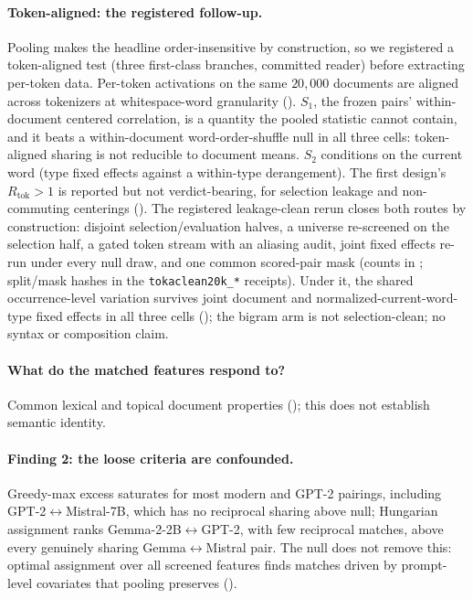 \paragraph{Token-aligned: the registered follow-up.}\label{sec:results:tokalign}
Pooling makes the headline order-insensitive by construction, so we registered a token-aligned
test (three first-class branches, committed reader) before extracting per-token data. Per-token
activations on the same $20{,}000$ documents are aligned across tokenizers at whitespace-word
granularity (). $S_1$, the frozen pairs' within-document
centered correlation, is a quantity the pooled statistic cannot contain, and it beats a
within-document word-order-shuffle null in all three cells: token-aligned sharing is not
reducible to document means. $S_2$ conditions on the current word (type fixed effects against a
within-type derangement). The first design's $R_{\text{tok}}>1$ is reported but not
verdict-bearing, for selection leakage and non-commuting centerings (). The
registered leakage-clean rerun closes both routes by construction: disjoint selection/evaluation
halves, a universe re-screened on the selection half, a gated token stream with an aliasing
audit, joint fixed effects re-run under every null draw, and one common scored-pair mask (counts
in ; split/mask hashes in the \texttt{tokaclean20k\_*} receipts). Under it,
the shared occurrence-level variation survives joint document and normalized-current-word-type
fixed effects in all three cells (); the bigram arm is not selection-clean; no syntax or composition claim.

\paragraph{What do the matched features respond to?} Common lexical and topical document
properties (); this does not establish semantic identity.

\paragraph{Finding 2: the loose criteria are confounded.} Greedy-max excess saturates for most modern and
GPT-2 pairings, including GPT-2$\leftrightarrow$Mistral-7B, which has
no reciprocal sharing above null; Hungarian assignment \citep{kuhn1955hungarian} ranks Gemma-2-2B$\leftrightarrow$GPT-2,
with few reciprocal matches, above every genuinely sharing Gemma$\leftrightarrow$Mistral pair. The
null does not remove this: optimal assignment over all screened features finds matches driven by
prompt-level covariates that pooling preserves ().


